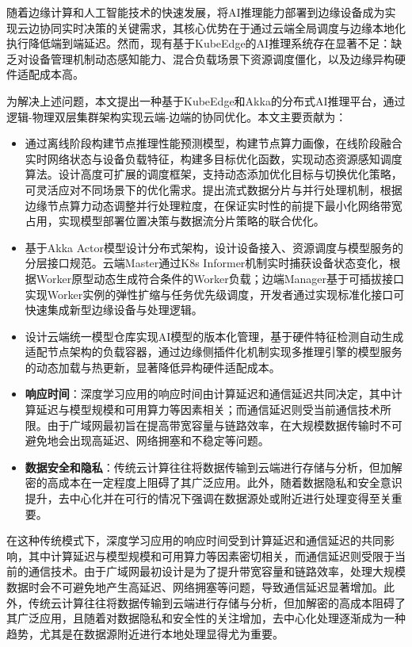 


随着边缘计算和人工智能技术的快速发展，将AI推理能力部署到边缘设备成为实现云边协同实时决策的关键需求，其核心优势在于通过云端全局调度与边缘本地化执行降低端到端延迟。然而，现有基于KubeEdge的AI推理系统存在显著不足：缺乏对设备管理机制动态感知能力、混合负载场景下资源调度僵化，以及边缘异构硬件适配成本高。

为解决上述问题，本文提出一种基于KubeEdge和Akka的分布式AI推理平台，通过逻辑-物理双层集群架构实现云端-边端的协同优化。本文主要贡献为：

\begin{itemize} 

\item 通过离线阶段构建节点推理性能预测模型，构建节点算力画像，在线阶段融合实时网络状态与设备负载特征，构建多目标优化函数，实现动态资源感知调度算法。设计高度可扩展的调度框架，支持动态添加优化目标与切换优化策略，可灵活应对不同场景下的优化需求。提出流式数据分片与并行处理机制，根据边缘节点算力动态调整并行处理粒度，在保证实时性的前提下最小化网络带宽占用，实现模型部署位置决策与数据流分片策略的联合优化。
\item 基于Akka Actor模型设计分布式架构，设计设备接入、资源调度与模型服务的分层接口规范。云端Master通过K8s Informer机制实时捕获设备状态变化，根据Worker原型动态生成符合条件的Worker负载；边端Manager基于可插拔接口实现Worker实例的弹性扩缩与任务优先级调度，开发者通过实现标准化接口可快速集成新型边缘设备与处理逻辑。
\item 设计云端统一模型仓库实现AI模型的版本化管理，基于硬件特征检测自动生成适配节点架构的负载容器，通过边缘侧插件化机制实现多推理引擎的模型服务的动态加载与热更新，显著降低异构硬件适配成本。
\end{itemize}



\begin{itemize} 
\item \textbf{响应时间}：深度学习应用的响应时间由计算延迟和通信延迟共同决定，其中计算延迟与模型规模和可用算力等因素相关；而通信延迟则受当前通信技术所限。由于广域网最初旨在提高带宽容量与链路效率，在大规模数据传输时不可避免地会出现高延迟、网络拥塞和不稳定等问题。
\item \textbf{数据安全和隐私}：传统云计算往往将数据传输到云端进行存储与分析，但加解密的高成本在一定程度上阻碍了其广泛应用。此外，随着数据隐私和安全意识提升，去中心化并在可行的情况下强调在数据源处或附近进行处理变得至关重要。
\end{itemize}


在这种传统模式下，深度学习应用的响应时间受到计算延迟和通信延迟的共同影响，其中计算延迟与模型规模和可用算力等因素密切相关，而通信延迟则受限于当前的通信技术。由于广域网最初设计是为了提升带宽容量和链路效率，处理大规模数据时会不可避免地产生高延迟、网络拥塞等问题，导致通信延迟显著增加。此外，传统云计算往往将数据传输到云端进行存储与分析，但加解密的高成本阻碍了其广泛应用，且随着对数据隐私和安全性的关注增加，去中心化处理逐渐成为一种趋势，尤其是在数据源附近进行本地处理显得尤为重要。


